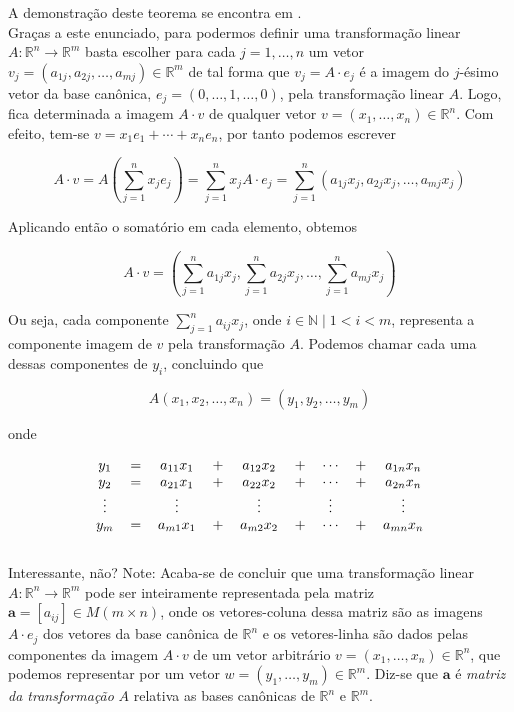 \documentclass[a4paper,12pt]{article}
\begin{document}
	A demonstração deste teorema se encontra em \cite{AlgebraLinearElon}. 
	\\
	
	Graças a este enunciado, para podermos definir uma transformação linear $A: \mathbb{R}^n \longrightarrow \mathbb{R}^m$ basta escolher para cada $j = 1, \dots, n$ um vetor $v_j = (a_{1j}, a_{2j}, \dots, a_{mj}) \in \mathbb{R}^m$ de tal forma que $v_j = A \cdot e_j$ é a imagem do $j$-ésimo vetor da base canônica, $e_j = (0, \dots, 1, \dots, 0)$, pela transformação linear $A$. Logo, fica determinada a imagem $A \cdot v$ de qualquer vetor $v = (x_1, \dots, x_n) \in \mathbb{R}^n$. Com efeito, tem-se $v = x_1e_1 + \cdots + x_ne_n$, por tanto podemos escrever
	
	$$A\cdot v = A (\sum_{j=1}^{n}x_je_j) = \sum_{j=1}^{n}x_jA\cdot e_j = \sum_{j=1}^{n}(a_{1j}x_j, a_{2j}x_j, \dots, a_{mj}x_j)$$
	
	Aplicando então o somatório em cada elemento, obtemos
	
	$$A \cdot v= (\sum_{j=1}^{n}a_{1j}x_j, \sum_{j=1}^{n}a_{2j}x_j, \dots, \sum_{j=1}^{n}a_{mj}x_j)$$
	
	Ou seja, cada componente $\sum_{j=1}^{n}a_{ij}x_j$, onde $i \in \mathbb{N} \mid 1<i<m$, representa a componente imagem de $v$ pela transformação $A$. Podemos chamar cada uma dessas componentes de $y_i$, concluindo que
	
	$$A(x_1, x_2, \dots, x_n) = (y_1, y_2, \dots, y_m)$$
	
	onde
	
	\[
	\begin{blockarray}{ccccccccc}
	\begin{block}{ccccccccc}
	y_1   & = & a_{11}x_1 & + & a_{12}x_2 & + & \cdots & + & a_{1n}x_n \\
	y_2   & = & a_{21}x_1 & + & a_{22}x_2 & + & \cdots & + & a_{2n}x_n \\
    \vdots &  & \vdots    &  & \vdots    &  & \vdots &  & \vdots    \\
	y_m   & = & a_{m1}x_1 & + & a_{m2}x_2 & + & \cdots & + & a_{mn}x_n \\
	\end{block}
	\end{blockarray}
	\] 
	
	Interessante, não? Note: Acaba-se de concluir que uma transformação linear $A: \mathbb{R}^n \longrightarrow \mathbb{R}^m$ pode ser inteiramente representada pela matriz $\mathbf{a} = [a_{ij}] \in M(m \times n)$, onde os vetores-coluna dessa matriz são as imagens $A\cdot e_j$ dos vetores da base canônica de $\mathbb{R}^n$ e os vetores-linha são dados pelas componentes da imagem $A\cdot v$ de um vetor arbitrário $v = (x_1, \dots, x_n) \in \mathbb{R}^n$, que podemos representar por um vetor $w = (y_1, \dots, y_m) \in \mathbb{R}^m$. \cite{AlgebraLinearElon} Diz-se que $\mathbf{a}$ é \textit{matriz da transformação} $A$ relativa as bases canônicas de $\mathbb{R}^n$ e $\mathbb{R}^m$.
	
\end{document}

